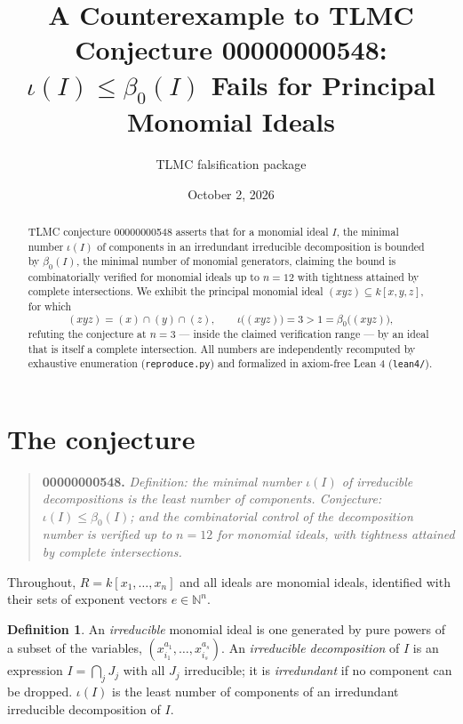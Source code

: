 \documentclass[11pt]{article}
\title{A Counterexample to TLMC Conjecture 00000000548:\\
$\iota(I)\le\beta_0(I)$ Fails for Principal Monomial Ideals}
\author{TLMC falsification package}
\date{October 2, 2026}
\theoremstyle{definition}
\newtheorem{definition}[theorem]{Definition}
\theoremstyle{remark}
\begin{document}
\maketitle

\begin{abstract}
TLMC conjecture 00000000548 asserts that for a monomial ideal $I$, the minimal
number $\iota(I)$ of components in an irredundant irreducible decomposition is
bounded by $\beta_0(I)$, the minimal number of monomial generators, claiming
the bound is combinatorially verified for monomial ideals up to $n=12$ with
tightness attained by complete intersections. We exhibit the principal monomial
ideal $(xyz)\subseteq k[x,y,z]$, for which
\[
(xyz)=(x)\cap(y)\cap(z),\qquad \iota\big((xyz)\big)=3>1=\beta_0\big((xyz)\big),
\]
refuting the conjecture at $n=3$ --- inside the claimed verification range ---
by an ideal that is itself a complete intersection. All numbers are
independently recomputed by exhaustive enumeration (\texttt{reproduce.py}) and
formalized in axiom-free Lean 4 (\texttt{lean4/}).
\end{abstract}

\section{The conjecture}

\begin{quote}
\textbf{00000000548.} \emph{Definition: the minimal number $\iota(I)$ of
irreducible decompositions is the least number of components. Conjecture:
$\iota(I)\le\beta_0(I)$; and the combinatorial control of the decomposition
number is verified up to $n=12$ for monomial ideals, with tightness attained
by complete intersections.}
\end{quote}

Throughout, $R=k[x_1,\dots,x_n]$ and all ideals are monomial ideals, identified
with their sets of exponent vectors $e\in\mathbb{N}^n$.

\begin{definition}\label{def:iota}
An \emph{irreducible} monomial ideal is one generated by pure powers of a
subset of the variables, $(x_{i_1}^{a_1},\dots,x_{i_s}^{a_s})$. An
\emph{irreducible decomposition} of $I$ is an expression $I=\bigcap_j J_j$
with all $J_j$ irreducible; it is \emph{irredundant} if no component can be
dropped. $\iota(I)$ is the least number of components of an irredundant
irreducible decomposition of $I$.
\end{definition}
\end{document}
